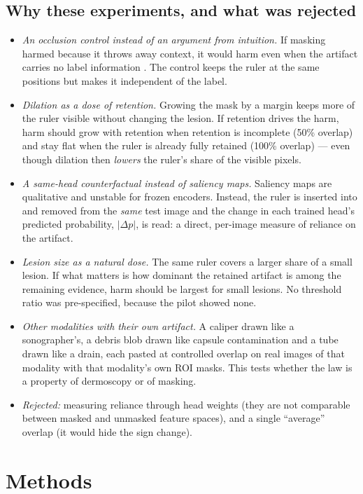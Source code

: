\subsection{Why these experiments, and what was rejected}
\begin{itemize}[leftmargin=*]\itemsep1pt
\item \emph{An occlusion control instead of an argument from intuition.} If masking harmed because it throws away
context, it would harm even when the artifact carries no label information \citep[cf.][]{fong2019occlusions}. The
control keeps the ruler at the same positions but makes it independent of the label.
\item \emph{Dilation as a dose of retention.} Growing the mask by a margin keeps more of the ruler visible without
changing the lesion. If retention drives the harm, harm should grow with retention when retention is incomplete (50\%
overlap) and stay flat when the ruler is already fully retained (100\% overlap) --- even though dilation then
\emph{lowers} the ruler's share of the visible pixels.
\item \emph{A same-head counterfactual instead of saliency maps.} Saliency maps are qualitative and unstable for frozen
encoders. Instead, the ruler is inserted into and removed from the \emph{same} test image and the change in each
trained head's predicted probability, $|\Delta p|$, is read: a direct, per-image measure of reliance on the artifact.
\item \emph{Lesion size as a natural dose.} The same ruler covers a larger share of a small lesion. If what matters is
how dominant the retained artifact is among the remaining evidence, harm should be largest for small lesions. No
threshold ratio was pre-specified, because the pilot showed none.
\item \emph{Other modalities with their own artifact.} A caliper drawn like a sonographer's, a debris blob drawn like
capsule contamination and a tube drawn like a drain, each pasted at controlled overlap on real images of that modality
with that modality's own ROI masks. This tests whether the law is a property of dermoscopy or of masking.
\item \emph{Rejected:} measuring reliance through head weights (they are not comparable between masked and unmasked
feature spaces), and a single ``average'' overlap (it would hide the sign change).
\end{itemize}

\section{Methods}

